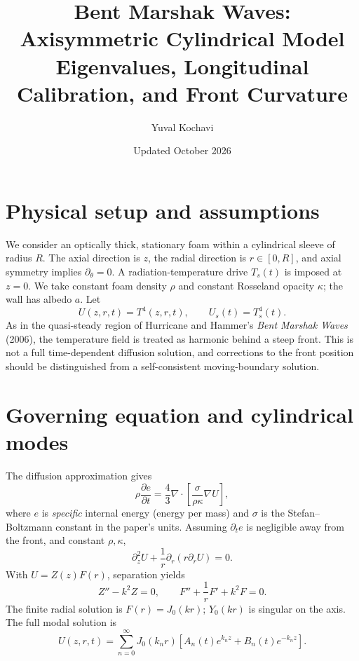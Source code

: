 \documentclass[11pt]{article}
\title{Bent Marshak Waves: Axisymmetric Cylindrical Model\\\large Eigenvalues, Longitudinal Calibration, and Front Curvature}
\author{Yuval Kochavi}
\date{Updated October 2026}
\numberwithin{equation}{section}
\begin{document}
\maketitle

\section{Physical setup and assumptions}
We consider an optically thick, stationary foam within a cylindrical sleeve of radius $R$. The axial direction is $z$, the radial direction is $r\in[0,R]$, and axial symmetry implies $\partial_\theta=0$. A radiation-temperature drive $T_s(t)$ is imposed at $z=0$. We take constant foam density $\rho$ and constant Rosseland opacity $\kappa$; the wall has albedo $a$. Let
\begin{equation} U(z,r,t)=T^4(z,r,t),\qquad U_s(t)=T_s^4(t).\end{equation}
As in the quasi-steady region of Hurricane and Hammer's \emph{Bent Marshak Waves} (2006), the temperature field is treated as harmonic behind a steep front. This is not a full time-dependent diffusion solution, and corrections to the front position should be distinguished from a self-consistent moving-boundary solution.

\section{Governing equation and cylindrical modes}
The diffusion approximation gives
\begin{equation}
\rho\frac{\partial e}{\partial t}=\frac43\nabla\!\cdot\!\left[\frac{\sigma}{\rho\kappa}\nabla U\right],
\end{equation}
where $e$ is \emph{specific} internal energy (energy per mass) and $\sigma$ is the Stefan--Boltzmann constant in the paper's units. Assuming $\partial_t e$ is negligible away from the front, and constant $\rho,\kappa$,
\begin{equation}\boxed{\partial_z^2 U+\frac1r\partial_r(r\partial_r U)=0.}\end{equation}
With $U=Z(z)F(r)$, separation yields
\begin{equation}Z''-k^2 Z=0,\qquad F''+\frac1rF'+k^2F=0.\end{equation}
The finite radial solution is $F(r)=J_0(kr)$; $Y_0(kr)$ is singular on the axis. The full modal solution is
\begin{equation}\boxed{U(z,r,t)=\sum_{n=0}^\infty J_0(k_n r)\left[A_n(t)e^{k_nz}+B_n(t)e^{-k_nz}\right].}\label{eq:general}\end{equation}
\end{document}
